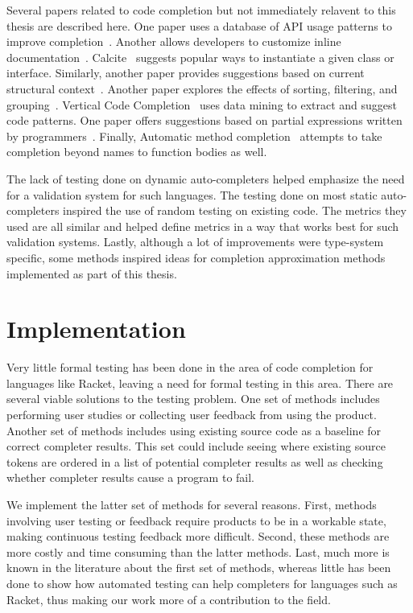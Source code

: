 \documentclass[ms,electronic,twosidetoc,letterpaper,chaptercenter,parttop,lol,lof,lot]{byumsphd}
\begin{document}
Several papers related to code completion but not immediately relavent to this thesis are described here.
One paper uses a database of API usage patterns to improve completion~\cite{Graph}.
Another allows developers to customize inline documentation~\cite{Active}.
Calcite~\cite{Calcite} suggests popular ways to instantiate a given class or interface.
Similarly, another paper provides suggestions based on current structural context~\cite{StructuralContext}.
Another paper explores the effects of sorting, filtering, and grouping~\cite{SortFilter}.
Vertical Code Completion~\cite{Vertical} uses data mining to extract and suggest code patterns.
One paper offers suggestions based on partial expressions written by programmers~\cite{Partial}.
Finally, Automatic method completion~\cite{Automatic} attempts to take completion beyond names to function bodies as well.

The lack of testing done on dynamic auto-completers helped emphasize the need for a validation system for such languages.
The testing done on most static auto-completers inspired the use of random testing on existing code.
The metrics they used are all similar and helped define metrics in a way that works best for such validation systems.
Lastly, although a lot of improvements were type-system specific, some methods inspired ideas for completion approximation methods implemented as part of this thesis.

\chapter{Implementation}

Very little formal testing has been done in the area of code completion for languages like Racket, leaving a need for formal testing in this area.
There are several viable solutions to the testing problem.
One set of methods includes performing user studies or collecting user feedback from using the product.
Another set of methods includes using existing source code as a baseline for correct completer results.
This set could include seeing where existing source tokens are ordered in a list of potential completer results as well as checking whether completer results cause a program to fail.

We implement the latter set of methods for several reasons.
First, methods involving user testing or feedback require products to be in a workable state, making continuous testing feedback more difficult.
Second, these methods are more costly and time consuming than the latter methods.
Last, much more is known in the literature about the first set of methods, whereas little has been done to show how automated testing can help completers for languages such as Racket, thus making our work more of a contribution to the field.
\end{document}
